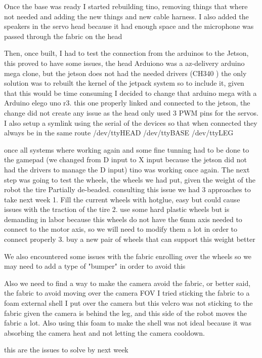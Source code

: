 Once the base was ready I started rebuilding tino, removing things that where not needed and adding the new things and new cable harness. I also added the speakers in the servo head because it had enough space and the microphone was passed through the fabric on the head

Then, once built, I had to test the connection from the arduinos to the Jetson, this proved to have some issues, the head Arduiono was a az-delivery arduino mega clone, but the jetson does not had the needed drivers (CH340 ) the only solution was to rebuilt the kernel of the jetpack system so to include it, given that this would be time consuming I decided to change that arduino mega with a Arduino elego uno r3. this one properly linked and connected to the jetson, the change did not create any issue as the head only used 3 PWM pins for the servos.
I also setup a symlink using the serial of the devices so that when connected they always be in the same route /dev/ttyHEAD /dev/ttyBASE /dev/ttyLEG

once all systems where working again and some fine tunning had to be done to the gamepad (we changed from D input to X input because the jetson did not had the drivers to manage the D input) tino was working once again. The next step was going to test the wheels, the wheels we had put, given the weight of the robot the tire Partially de-beaded. consulting this issue we had 3 approaches to take next week
1. Fill the current wheels with hotglue, easy but could cause issues with the traction of the tire
2. use some hard plastic wheels but is demanding in labor because this wheels do not have the 6mm axis needed to connect to the motor axis, so we will need to modify them a lot in order to connect properly
3. buy a new pair of wheels that can support this weight better

We also encountered some issues with the fabric enrolling over the wheels so we may need to add a type of "bumper" in order to avoid this

Also we need to find a way to make the camera avoid the fabric, or better said, the fabric to avoid moving over the camera FOV
I tried sticking the fabric to a foam external shell I put over the camera but this velcro was not sticking to the fabric given the camera is behind the leg, and this side of the robot moves the fabric a lot. Also using this foam to make the shell was not ideal because it was absorbing the camera heat and not letting the camera cooldown.

this are the issues to solve by next week






